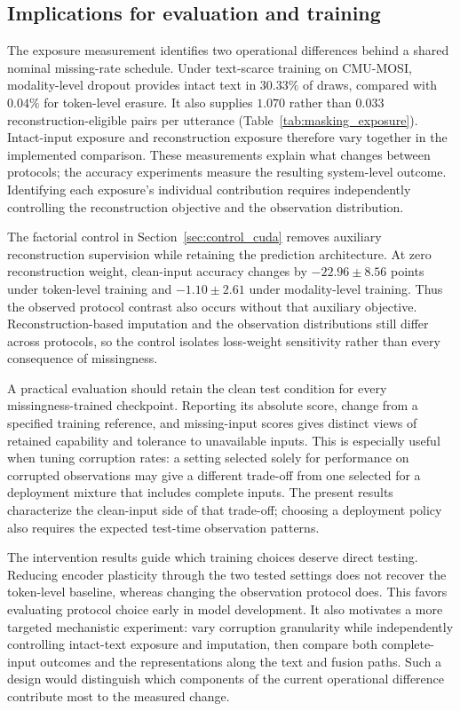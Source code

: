 \documentclass[preprint,11pt]{elsarticle}
\begin{document}
\subsection{Implications for evaluation and training}

The exposure measurement identifies two operational differences behind a
shared nominal missing-rate schedule. Under text-scarce training on CMU-MOSI,
modality-level dropout provides intact text in $30.33\%$ of draws, compared
with $0.04\%$ for token-level erasure. It also supplies $1.070$ rather than
$0.033$ reconstruction-eligible pairs per utterance
(Table~\ref{tab:masking_exposure}). Intact-input exposure and reconstruction
exposure therefore vary together in the implemented comparison. These
measurements explain what changes between protocols; the accuracy experiments
measure the resulting system-level outcome. Identifying each exposure's
individual contribution requires independently controlling the reconstruction
objective and the observation distribution.

The factorial control in Section~\ref{sec:control_cuda} removes auxiliary
reconstruction supervision while retaining the prediction architecture.
At zero reconstruction weight, clean-input accuracy changes by
$-22.96\pm8.56$ points under token-level training and $-1.10\pm2.61$ under
modality-level training. Thus the observed protocol contrast also occurs
without that auxiliary objective. Reconstruction-based imputation and the
observation distributions still differ across protocols, so the control
isolates loss-weight sensitivity rather than every consequence of missingness.

A practical evaluation should retain the clean test condition for every
missingness-trained checkpoint. Reporting its absolute score, change from a
specified training reference, and missing-input scores gives distinct views
of retained capability and tolerance to unavailable inputs. This is especially
useful when tuning corruption rates: a setting selected solely for performance
on corrupted observations may give a different trade-off from one selected
for a deployment mixture that includes complete inputs. The present results
characterize the clean-input side of that trade-off; choosing a deployment
policy also requires the expected test-time observation patterns.

The intervention results guide which training choices deserve direct testing.
Reducing encoder plasticity through the two tested settings does not recover
the token-level baseline, whereas changing the observation protocol does.
This favors evaluating protocol choice early in model development. It also
motivates a more targeted mechanistic experiment: vary corruption granularity
while independently controlling intact-text exposure and imputation, then compare both
complete-input outcomes and the representations along the text and fusion
paths. Such a design would distinguish which components of the current
operational difference contribute most to the measured change.
\end{document}
